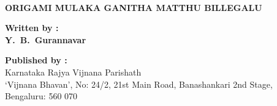 

~
\thispagestyle{empty}


{\bfseries ORIGAMI MULAKA GANITHA MATTHU BILLEGALU}

\begin{center}
{\rm {\bfseries Written by :} \\
			{\bfseries Y.~B.~Gurannavar}}
   \end{center}


\begin{center}
{\rm {\bfseries Published by :} \\
			Karnataka Rajya Vijnana Parishath\\ ‘Vijnana Bhavan’, No: 24/2, 21st Main Road, Banashankari 2nd Stage,\\ Bengaluru: 560 070}
   \end{center}
 
 \vspace{-.4cm}
   
